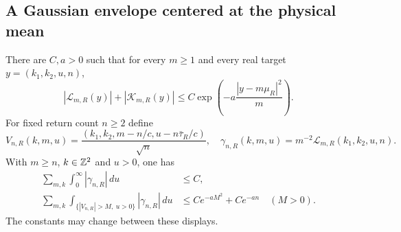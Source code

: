 \subsection{A Gaussian envelope centered at the physical mean}
\begin{lemma}
\label{lem:v57-transition-envelope}
There are $C,a>0$ such that for every $m\ge1$ and every real target
$y=(k_1,k_2,u,n)$,
\begin{equation}\label{eq:v57-Gaussian-envelope}
 |\mathcal L_{m,R}(y)|+|\mathcal K_{m,R}(y)|
                 \le C\exp\left(-a\frac{|y-m\mu_R|^2}{m}\right).
\end{equation}
For fixed return count $n\ge2$ define
\[
 V_{n,R}(k,m,u)=\frac{(k_1,k_2,m-n/c,u-n\bar\tau_R/c)}{\sqrt n},
 \quad \gamma_{n,R}(k,m,u)=m^{-2}\mathcal L_{m,R}(k_1,k_2,u,n).
\]
With $m\ge n$, $k\in\mathbb Z^2$ and $u>0$, one has
\begin{align}
 \sum_{m,k}\int_0^\infty|\gamma_{n,R}|\,du&\le C,
                                      \label{eq:v57-total-reference}\\
 \sum_{m,k}\int_{\{|V_{n,R}|>M,\ u>0\}}|\gamma_{n,R}|\,du
                       &\le C e^{-aM^2}+C e^{-an}
                                      \quad(M>0).
                                      \label{eq:v57-reference-tail}
\end{align}
The constants may change between these displays.
\end{lemma}
